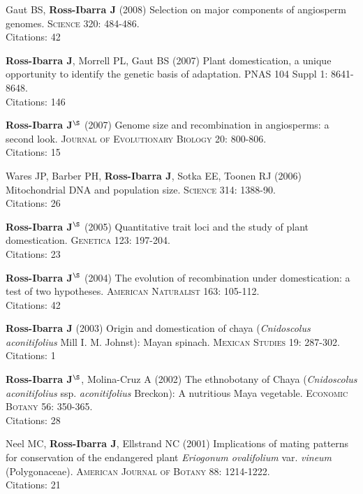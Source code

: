 \documentclass[letterpaper]{article}
\begin{document}
\begin{etaremune}
\item Gaut BS, {\bf Ross-Ibarra J} (2008) Selection on major components of angiosperm genomes.  \textsc{Science} 320: 484-486.
\\Citations: 42\\

\item {\bf Ross-Ibarra J}, Morrell PL, Gaut BS (2007) Plant domestication, a unique opportunity to identify the genetic basis of adaptation. PNAS 104 Suppl 1: 8641-8648. 
\\Citations: 146\\

\item {\bf Ross-Ibarra J}$^\S$ (2007) Genome size and recombination in angiosperms: a second look.  \textsc{Journal of Evolutionary Biology} 20: 800-806.
\\Citations: 15\\

\item Wares JP, Barber PH, {\bf Ross-Ibarra J}, Sotka EE, Toonen RJ (2006) Mitochondrial DNA and population size.  \textsc{Science} 314: 1388-90.
\\Citations: 26\\

\item {\bf Ross-Ibarra J}$^\S$ (2005) Quantitative trait loci and the study of plant domestication.  \textsc{Genetica} 123: 197-204. 
\\Citations: 23\\

\item {\bf Ross-Ibarra J}$^\S$ (2004) The evolution of recombination under domestication: a test of two hypotheses.  \textsc{American Naturalist} 163: 105-112.
\\Citations: 42\\

\item {\bf Ross-Ibarra J} (2003) Origin and domestication of chaya (\emph{Cnidoscolus aconitifolius} Mill I. M. Johnst): Mayan spinach.  \textsc{Mexican Studies} 19: 287-302.
\\Citations: 1\\

\item {\bf Ross-Ibarra J}$^\S$, Molina-Cruz A (2002) The ethnobotany of Chaya (\emph{Cnidoscolus aconitifolius} ssp. \emph{aconitifolius} Breckon): A nutritious Maya vegetable.  \textsc{Economic Botany} 56: 350-365.
\\Citations: 28\\

\item  Neel MC, {\bf Ross-Ibarra J}, Ellstrand NC (2001) Implications of mating patterns for conservation of the endangered plant \emph{Eriogonum ovalifolium} var. \emph{vineum} (Polygonaceae).  \textsc{American Journal of Botany} 88: 1214-1222.
\\Citations: 21\\
\end{etaremune}
\end{document}
